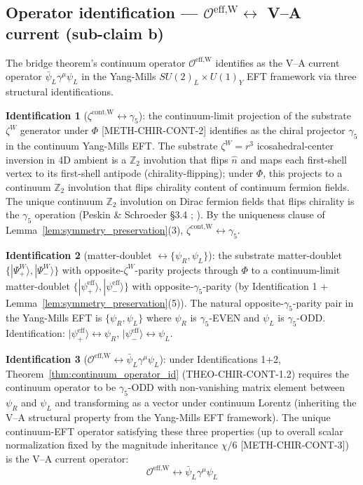 \documentclass[11pt,letterpaper]{article}
\newcommand{\OeffW}{\mathcal{O}^{\text{eff,W}}}
\newcommand{\methref}[1]{\textsf{\small[\textsc{#1}]}}
\begin{document}
\subsection{Operator identification --- $\OeffW \leftrightarrow$ V--A current (sub-claim b)}
\label{sec:operator_id_sector_a}

The bridge theorem's continuum operator $\OeffW$ identifies as the V--A current operator $\bar{\psi}_L \gamma^\mu \psi_L$ in the Yang-Mills $SU(2)_L \times U(1)_Y$ EFT framework via three structural identifications.

\textbf{Identification 1} ($\zeta^{\text{cont,W}} \leftrightarrow \gamma_5$): the continuum-limit projection of the substrate $\zeta^W$ generator under $\Phi$ \methref{METH-CHIR-CONT-2} identifies as the chiral projector $\gamma_5$ in the continuum Yang-Mills EFT. The substrate $\zeta^W = r^3$ icosahedral-center inversion in 4D ambient is a $\mathbb{Z}_2$ involution that flips $\hat{n}$ and maps each first-shell vertex to its first-shell antipode (chirality-flipping); under $\Phi$, this projects to a continuum $\mathbb{Z}_2$ involution that flips chirality content of continuum fermion fields. The unique continuum $\mathbb{Z}_2$ involution on Dirac fermion fields that flips chirality is the $\gamma_5$ operation (Peskin \& Schroeder §3.4 \cite{Peskin}; \cite{ChengLi}). By the uniqueness clause of Lemma~\ref{lem:symmetry_preservation}(3), $\zeta^{\text{cont,W}} \leftrightarrow \gamma_5$.

\textbf{Identification 2} (matter-doublet $\leftrightarrow \{\psi_R, \psi_L\}$): the substrate matter-doublet $\{|\Psi^W_+\rangle, |\Psi^W_-\rangle\}$ with opposite-$\zeta^W$-parity projects through $\Phi$ to a continuum-limit matter-doublet $\{|\psi^{\text{eff}}_+\rangle, |\psi^{\text{eff}}_-\rangle\}$ with opposite-$\gamma_5$-parity (by Identification 1 + Lemma~\ref{lem:symmetry_preservation}(5)). The natural opposite-$\gamma_5$-parity pair in the Yang-Mills EFT is $\{\psi_R, \psi_L\}$ where $\psi_R$ is $\gamma_5$-EVEN and $\psi_L$ is $\gamma_5$-ODD. Identification: $|\psi^{\text{eff}}_+\rangle \leftrightarrow \psi_R$, $|\psi^{\text{eff}}_-\rangle \leftrightarrow \psi_L$.

\textbf{Identification 3} ($\OeffW \leftrightarrow \bar{\psi}_L \gamma^\mu \psi_L$): under Identifications 1+2, Theorem~\ref{thm:continuum_operator_id} (THEO-CHIR-CONT-1.2) requires the continuum operator to be $\gamma_5$-ODD with non-vanishing matrix element between $\psi_R$ and $\psi_L$ and transforming as a vector under continuum Lorentz (inheriting the V--A structural property from the Yang-Mills EFT framework). The unique continuum-EFT operator satisfying these three properties (up to overall scalar normalization fixed by the magnitude inheritance $\chi/6$ \methref{METH-CHIR-CONT-3}) is the V--A current operator:
\begin{equation}
\boxed{\OeffW \leftrightarrow \bar{\psi}_L \gamma^\mu \psi_L}
\label{eq:VA_current_identification}
\end{equation}
\end{document}
